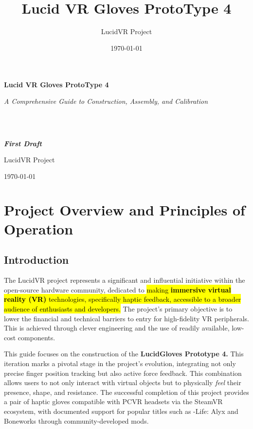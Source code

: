 \documentclass{article}
\title{\textbf{Lucid VR Gloves ProtoType 4}}
\author{LucidVR Project}
\date{\today}
\begin{document}
\begin{titlepage}
    \centering
    \vspace*{1in}
    
    {\Huge \bfseries Lucid VR Gloves ProtoType 4\par}
    
    \vspace{0.5cm}
    
    {\Large \itshape A Comprehensive Guide to Construction, Assembly, and Calibration\par}
     \\\\{\Large \itshape \textbf{First Draft}\par}
    \vfill
    
    {\large LucidVR Project\par}
    
    \vspace{0.8cm}
    
    {\large \today\par}
    
\end{titlepage}

\section{Project Overview and Principles of Operation}
\subsection{Introduction}
The LucidVR project represents a significant and influential initiative within the open-source hardware community, dedicated to \hl{making \textbf{immersive virtual reality (VR) }technologies, specifically haptic feedback, accessible to a broader audience of enthusiasts and developers.} The project's primary objective is to lower the financial and technical barriers to entry for high-fidelity VR peripherals. This is achieved through clever engineering and the use of readily available, low-cost components.

This guide focuses on the construction of the \textbf{LucidGloves Prototype 4.} This iteration marks a pivotal stage in the project's evolution, integrating not only precise finger position tracking but also active force feedback. This combination allows users to not only interact with virtual objects but to physically \textit{feel} their presence, shape, and resistance. The successful completion of this project provides a pair of haptic gloves compatible with PCVR headsets via the SteamVR ecosystem, with documented support for popular titles such as \lambdaHalf-Life: Alyx  and Boneworks through community-developed mods.
\end{document}
